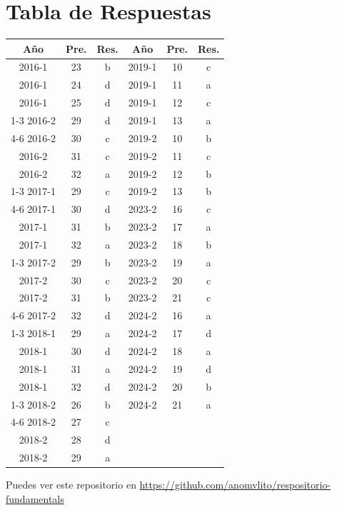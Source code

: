 \documentclass{article}
\begin{document}
\section*{Tabla de Respuestas}
\begin{center}
\begin{tabular}{|c|c|c||c|c|c|}
\hline
\textbf{Año} & \textbf{Pre.} & \textbf{Res.} & \textbf{Año} & \textbf{Pre.} & \textbf{Res.} \\ \hline
2016-1 & 23 & b & 2019-1 & 10 & c \\
2016-1 & 24 & d & 2019-1 & 11 & a \\
2016-1 & 25 & d & 2019-1 & 12 & c \\ \cline{1-3}
2016-2 & 29 & d & 2019-1 & 13 & a \\ \cline{4-6}
2016-2 & 30 & c & 2019-2 & 10 & b \\
2016-2 & 31 & c & 2019-2 & 11 & c \\
2016-2 & 32 & a & 2019-2 & 12 & b \\ \cline{1-3}
2017-1 & 29 & c & 2019-2 & 13 & b \\ \cline{4-6}
2017-1 & 30 & d & 2023-2 & 16 & c \\
2017-1 & 31 & b & 2023-2 & 17 & a \\
2017-1 & 32 & a & 2023-2 & 18 & b \\ \cline{1-3}
2017-2 & 29 & b & 2023-2 & 19 & a \\
2017-2 & 30 & c & 2023-2 & 20 & c \\
2017-2 & 31 & b & 2023-2 & 21 & c \\ \cline{4-6}
2017-2 & 32 & d & 2024-2 & 16 & a \\ \cline{1-3}
2018-1 & 29 & a & 2024-2 & 17 & d \\
2018-1 & 30 & d & 2024-2 & 18 & a \\
2018-1 & 31 & a & 2024-2 & 19 & d \\
2018-1 & 32 & d & 2024-2 & 20 & b \\ \cline{1-3}
2018-2 & 26 & b & 2024-2 & 21 & a \\ \cline{4-6}
2018-2 & 27 & c & & & \\
2018-2 & 28 & d & & & \\
2018-2 & 29 & a & & & \\ \hline
\end{tabular}
\end{center}
\endgroup

\vfill
\begin{center}
    \small Puedes ver este repositorio en \url{https://github.com/anomvlito/respositorio-fundamentals}
\end{center}
\end{document}
